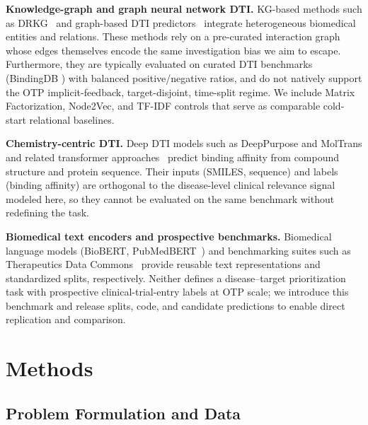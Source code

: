 \documentclass{article}
\begin{document}
\textbf{Knowledge-graph and graph neural network DTI.}
KG-based methods such as DRKG~\citep{ioannidis2020drkg} and graph-based DTI predictors~\citep{ratajczak2022taskdriven,nicholson2020}
integrate heterogeneous biomedical entities and relations.
These methods rely on a pre-curated interaction graph whose edges
themselves encode the same investigation bias we aim to escape.
Furthermore, they are typically evaluated on curated DTI benchmarks (BindingDB \citep{liu_bindingdb_2007}) with
balanced positive/negative ratios, and do not natively support the
OTP implicit-feedback, target-disjoint, time-split regime.
We include Matrix Factorization, Node2Vec, and TF-IDF controls that serve as
comparable cold-start relational baselines.

\textbf{Chemistry-centric DTI.}
Deep DTI models such as DeepPurpose and MolTrans and related transformer
approaches~\citep{huang2020,huang2021moltrans} predict binding affinity from compound
structure and protein sequence. Their inputs (SMILES, sequence) and
labels (binding affinity) are orthogonal to the disease-level clinical
relevance signal modeled here, so they cannot be evaluated on the
same benchmark without redefining the task.

\textbf{Biomedical text encoders and prospective benchmarks.}
Biomedical language models (BioBERT, PubMedBERT~\citep{gu2021}) and
benchmarking suites such as Therapeutics Data Commons~\citep{huang2021tdc}
provide reusable text representations and standardized splits, respectively.
Neither defines a disease--target prioritization task with
prospective clinical-trial-entry labels at OTP scale; we introduce
this benchmark and release splits, code, and candidate predictions
to enable direct replication and comparison.

\section{Methods}
\label{sec:methods}

\subsection{Problem Formulation and Data}
\end{document}
